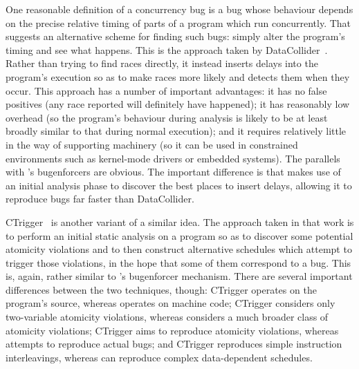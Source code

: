 One reasonable definition of a concurrency bug is a bug whose
behaviour depends on the precise relative timing of parts of a program
which run concurrently.  That suggests an alternative scheme for
finding such bugs: simply alter the program's timing and see what
happens.  This is the approach taken by
DataCollider~\cite{Erickson2010}.  Rather than trying to find races
directly, it instead inserts delays into the program's execution so as
to make races more likely and detects them when they occur.  This
approach has a number of important advantages: it has no false
positives (any race reported will definitely have happened); it has
reasonably low overhead (so the program's behaviour during analysis is
likely to be at least broadly similar to that during normal
execution); and it requires relatively little in the way of supporting
machinery (so it can be used in constrained environments such as
kernel-mode drivers or embedded systems).  The parallels with
{\technique}'s \glspl{bugenforcer} are obvious.  The important
difference is that {\technique} makes use of an initial analysis phase
to discover the best places to insert delays, allowing it to reproduce
bugs far faster than DataCollider.

CTrigger~\cite{Zhou} is another variant of a similar idea.  The
approach taken in that work is to perform an initial static analysis
on a program so as to discover some potential atomicity violations and
to then construct alternative schedules which attempt to trigger those
violations, in the hope that some of them correspond to a bug.  This
is, again, rather similar to {\technique}'s \gls{bugenforcer}
mechanism.  There are several important differences between the two
techniques, though: CTrigger operates on the program's source, whereas
{\technique} operates on machine code; CTrigger considers only
two-variable atomicity violations, whereas {\technique} considers a
much broader class of atomicity violations; CTrigger aims to reproduce
atomicity violations, whereas {\technique} attempts to reproduce
actual bugs; and CTrigger reproduces simple instruction interleavings,
whereas {\technique} can reproduce complex data-dependent schedules.

